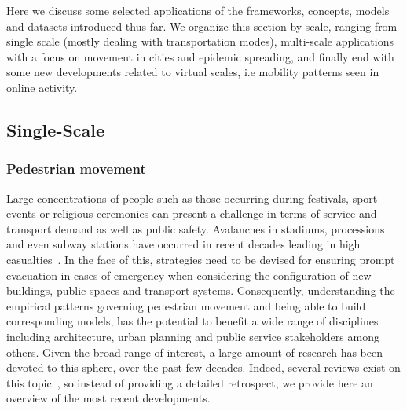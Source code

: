 
Here we discuss some selected applications of the frameworks, concepts, models and datasets introduced thus far. We organize this section by scale, ranging from single scale (mostly dealing with transportation modes), multi-scale applications with a focus on movement in cities and epidemic spreading, and finally end with some new developments related to virtual scales, i.e mobility patterns seen in online activity.


\subsection{Single-Scale}

\subsubsection{Pedestrian movement}

Large concentrations of people such as those occurring during festivals, sport events or religious ceremonies can present a challenge in terms of service and transport demand as well as public safety. Avalanches in stadiums, processions and even subway stations have occurred in recent decades leading in high casualties~\cite{helbing_2013_pedestrian}. In the face of this, strategies need to be devised for ensuring prompt evacuation in cases of emergency when considering the configuration of new buildings, public spaces and transport systems. Consequently, understanding the empirical patterns governing pedestrian movement and being able to build corresponding models, has the potential to benefit a wide range of disciplines including architecture, urban planning and public service stakeholders among others. Given the broad range of interest, a large amount of research has been devoted to this sphere, over the past few decades. Indeed, several reviews exist on this topic~\cite{helbing_2013_pedestrian,helbing_2001_traffic,zainuddin_2010_characteristics,vicsek_2012_collective,benenson_2014_ten,cao_2015_cyber}, so instead of providing a detailed retrospect, we provide here an overview of the most recent developments. 

